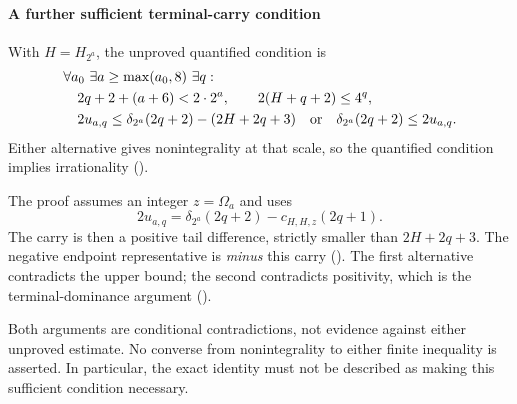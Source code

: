\paragraph{A further sufficient terminal-carry condition}
With $H=H_{2^a}$, the unproved quantified condition is
\[
\begin{aligned}
 &\forall a_0\ \exists a\ge\max(a_0,8)\ \exists q:\\
 &\quad 2q+2+(a+6)<2\cdot2^a,\qquad 2(H+q+2)\le4^q,\\
 &\quad 2u_{a,q}\le\delta_{2^a}(2q+2)-(2H+2q+3)
       \quad\hbox{or}\quad \delta_{2^a}(2q+2)\le2u_{a,q}.
\end{aligned}
\]
Either alternative gives nonintegrality at that scale, so the
quantified condition implies irrationality
().

The proof assumes an integer $z=\Omega_a$ and uses
\[
 2u_{a,q}=\delta_{2^a}(2q+2)-c_{H,H,z}(2q+1).
\]
The carry is then a positive tail difference, strictly smaller than
$2H+2q+3$. The negative endpoint representative is \emph{minus} this
carry
().
The first alternative contradicts the upper bound; the second
contradicts positivity, which is the terminal-dominance argument
().

Both arguments are conditional contradictions, not evidence against
either unproved estimate. No converse from nonintegrality to either
finite inequality is asserted. In particular, the exact identity must
not be described as making this sufficient condition necessary.



